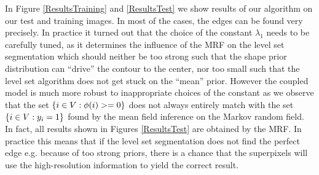 \documentclass{article} %
\begin{document}
In Figure \ref{ResultsTraining} and \ref{ResultsTest} we show results of our algorithm on our test and training images. In most of the cases, the edges can be found very precisely. In practice it turned out that the choice of the constant $\lambda_1$ needs to be carefully tuned, as it determines the influence of the MRF on the level set segmentation which should neither be too strong such that the shape prior distribution can ``drive'' the contour to the center, nor too small such that the level set algorithm does not get stuck on the ``mean'' prior. However the coupled model is much more robust to inappropriate choices of the constant as we observe that the set $\{i\in V: \phi(i) >=0\}$  does not always entirely match with the set $\{i\in V: y_i =1\}$ found by the mean field inference on the Markov random field. In fact, all results shown in Figures \ref{ResultsTest} are obtained by the MRF. In practice this means that if the level set segmentation does not find the perfect edge e.g. because of too strong priors, there is a chance that the superpixels will use the high-resolution information to yield the correct result.
\end{document}
